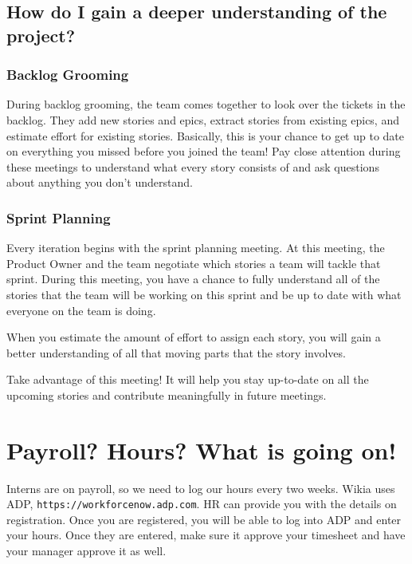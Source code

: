\documentclass[oneside]{book}
\begin{document}
\section{How do I gain a deeper understanding of the project?}
\subsection{Backlog Grooming}
During backlog grooming, the team comes together to look over the tickets in the backlog. They add new stories and epics, extract stories from existing epics, and estimate effort for existing stories. Basically, this is your chance to get up to date on everything you missed before you joined the team! Pay close attention during these meetings to understand what every story consists of and ask questions about anything you don't understand.
\subsection{Sprint Planning}
Every iteration begins with the sprint planning meeting. At this meeting, the Product Owner and the team negotiate which stories a team will tackle that sprint. During this meeting, you have a chance to fully understand all of the stories that the team will be working on this sprint and be up to date with what everyone on the team is doing. \par
When you estimate the amount of effort to assign each story, you will gain a better understanding of all that moving parts that the story involves. 

Take advantage of this meeting! It will help you stay up-to-date on all the upcoming stories and contribute meaningfully in future meetings.
\chapter{Payroll? Hours? What is going on!}
Interns are on payroll, so we need to log our hours every two weeks. Wikia uses ADP, \texttt{https://workforcenow.adp.com}. HR can provide you with the details on registration. Once you are registered, you will be able to log into ADP and enter your hours. Once they are entered, make sure it approve your timesheet and have your manager approve it as well.
\end{document}
